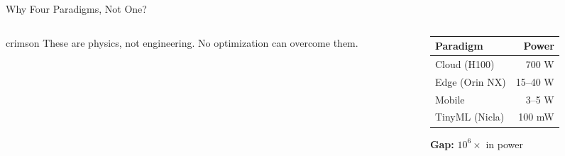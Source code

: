 \documentclass[aspectratio=169, 12pt]{beamer}
\begin{document}
\begin{frame}{Why Four Paradigms, Not One?}
\begin{columns}[T]
\begin{column}{0.55\textwidth}
    \vspace{0.1cm}
    \begin{mlsyscard}{crimson}
    These are \alert{physics, not engineering}. No optimization can overcome them.
    \end{mlsyscard}
  \end{column}
  \begin{column}{0.42\textwidth}
    \vspace{0.2cm}
    \renewcommand{\arraystretch}{1.15}
    \begin{tabular}{@{}lr@{}}
      \toprule
      \textbf{Paradigm} & \textbf{Power} \\
      \midrule
      Cloud (H100)   & 700 W \\
      Edge (Orin NX) & 15--40 W \\
      Mobile         & 3--5 W \\
      TinyML (Nicla) & 100 mW \\
      \bottomrule
    \end{tabular}

    \vspace{0.1cm}
    \textcolor{errorstroke}{\textbf{Gap:}} $10^{6}\!\times$ in power
  \end{column}
\end{columns}

\end{frame}
\end{document}
